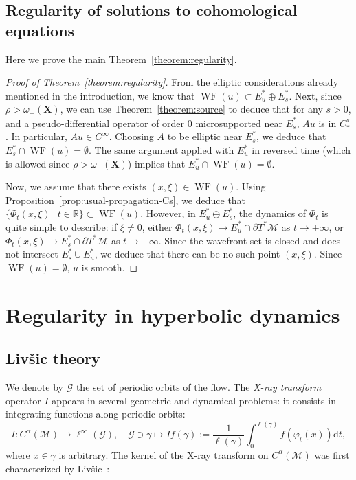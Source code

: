 \documentclass[10pt]{amsart}
\theoremstyle{definition}\newtheorem{defi}[theo]{Definition}\newtheorem{rema}[theo]{Remark}\newtheorem{exam}[theo]{Example}\newtheorem{exem}[theo]{Example}\newtheorem{nota}[theo]{Notation}
\newcommand{\R}{\mathbb{R}}
\newcommand{\X}{\mathbf{X}}
\newcommand{\mc}{\mathcal}
\newcommand{\M}{\mathcal{M}}
\newcommand{\dd}{\mathrm{d}}
\DeclareMathOperator{\WF}{WF}
\begin{document}
\subsection{Regularity of solutions to cohomological equations}\label{sec:proof-main}

Here we prove the main Theorem~\ref{theorem:regularity}.

\begin{proof}[Proof of Theorem~\ref{theorem:regularity}]
From the elliptic considerations already mentioned in the introduction, we know that $\WF(u) \subset E^\ast_u \oplus E^\ast_s$. Next, since $\rho >
\omega_+(\X)$, we can use Theorem~\ref{theorem:source} to deduce that for any $s>0$, and a pseudo-differential operator of order $0$ microsupported near $E^\ast_s$, $Au$ is in $C^s_\ast$. In particular, $A u\in C^\infty$. Choosing $A$ to be elliptic near $E^\ast_s$, we deduce that $E^\ast_s \cap \WF(u) =
\emptyset$. The same argument applied with $E^\ast_u$ in reversed time (which is allowed since $\rho > \omega_-(\X)$) implies that $E^\ast_u \cap \WF(u) =
\emptyset$.

Now, we assume that there exists $(x,\xi)\in \WF(u)$. Using Proposition~\ref{prop:usual-propagation-Cs}, we deduce that $\{ \Phi_t(x,\xi) \ |\ t\in \R\}\subset \WF(u)$. However, in $E^\ast_u \oplus E^\ast_s$, the dynamics of $\Phi_t$ is quite simple to describe: if $\xi\neq 0$, either $\Phi_t(x,\xi) \to E^\ast_u \cap \partial T^\ast \M$ as $t\to + \infty$, or $\Phi_t(x,\xi) \to E^\ast_s\cap \partial T^\ast \M$ as $t\to -\infty$. Since the wavefront set is closed and does not intersect $E^\ast_s \cup E^\ast_u$, we deduce that there can be no such point $(x,\xi)$. Since $\WF(u) = \emptyset$, $u$ is smooth.
\end{proof}



\section{Regularity in hyperbolic dynamics}
\label{section:cohomological}


\subsection{Liv{\v s}ic theory}

We denote by $\mc{G}$ the set of periodic orbits of the flow. The \emph{X-ray transform} operator $I$ appears in several geometric and dynamical problems: it consists in integrating functions along periodic orbits:
\begin{equation}\label{equation:xray}
I : C^\alpha(\M) \rightarrow \ell^\infty(\mc{G}),\quad \mc{G} \ni \gamma \mapsto If(\gamma) := \dfrac{1}{\ell(\gamma)} \int_0^{\ell(\gamma)} f(\varphi_t(x)) \dd t,
\end{equation}
where $x \in \gamma$ is arbitrary. The kernel of the X-ray transform on $C^\alpha(\M)$ was first characterized by Liv{\v s}ic~\cite{Livsic-72}:
\end{document}
